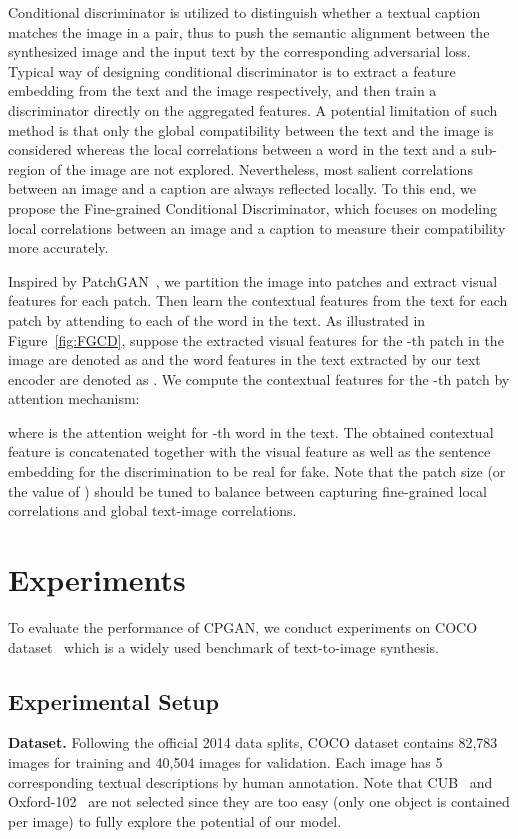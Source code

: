 \documentclass[runningheads]{llncs}
\begin{document}
Conditional discriminator is utilized to distinguish whether a textual caption matches the image in a pair, thus to push the semantic alignment between the synthesized image and the input text by the corresponding adversarial loss. Typical way of designing conditional discriminator is to extract a feature embedding from the text and the image respectively, and then train a discriminator directly on the aggregated features. A potential limitation of such method is that only the global compatibility between the text and the image is considered whereas the local correlations between a word in the text and a sub-region of the image are not explored. Nevertheless, most salient correlations between an image and a caption are always reflected locally. To this end, we propose the Fine-grained Conditional Discriminator, which focuses on modeling local correlations between an image and a caption to measure their compatibility more accurately. 

\noindent Inspired by PatchGAN~\cite{isola2017image}, we partition the image into  patches and extract visual features for each patch. Then learn the contextual features from the text for each patch by attending to each of the word in the text. As illustrated in Figure~\ref{fig:FGCD}, suppose the extracted visual features for the -th patch in the image are denoted as  and the word features in the text extracted by our text encoder are denoted as . We compute the contextual features for the -th patch by attention mechanism:
\begin{small}

\end{small}

\noindent
where  is the attention weight for -th word in the text. The obtained contextual feature  is concatenated together with the visual feature  as well as the sentence embedding  for the discrimination to be real for fake. 
Note that the patch size (or the value of ) should be tuned to balance between capturing fine-grained local correlations and global text-image correlations. 
\section{Experiments}

To evaluate the performance of CPGAN, we conduct experiments on COCO dataset~\cite{lin2014microsoft} which is a widely used benchmark of text-to-image synthesis. 

 \subsection{Experimental Setup}
 \smallskip\noindent\textbf{Dataset.} Following the official 2014 data splits, COCO dataset contains 82,783 images for training and 40,504 images for validation. Each image has 5 corresponding textual descriptions by human annotation. Note that CUB~\cite{wah2011caltech} and Oxford-102~\cite{nilsback2008automated} are not selected since they are too easy (only one object is contained per image) to fully explore the potential of our model. 
 
\end{document}
